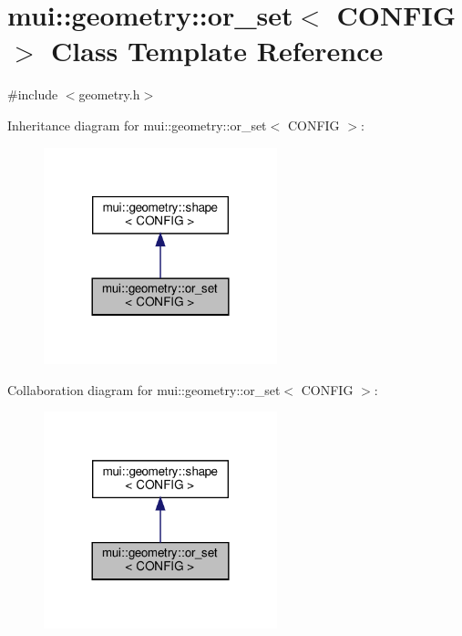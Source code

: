 \hypertarget{classmui_1_1geometry_1_1or__set}{}\section{mui\+:\+:geometry\+:\+:or\+\_\+set$<$ C\+O\+N\+F\+IG $>$ Class Template Reference}
\label{classmui_1_1geometry_1_1or__set}


{\ttfamily \#include $<$geometry.\+h$>$}



Inheritance diagram for mui\+:\+:geometry\+:\+:or\+\_\+set$<$ C\+O\+N\+F\+IG $>$\+:
\nopagebreak
\begin{figure}[H]
\begin{center}
\leavevmode
\includegraphics[width=192pt]{classmui_1_1geometry_1_1or__set__inherit__graph}
\end{center}
\end{figure}


Collaboration diagram for mui\+:\+:geometry\+:\+:or\+\_\+set$<$ C\+O\+N\+F\+IG $>$\+:
\nopagebreak
\begin{figure}[H]
\begin{center}
\leavevmode
\includegraphics[width=192pt]{classmui_1_1geometry_1_1or__set__coll__graph}
\end{center}
\end{figure}
